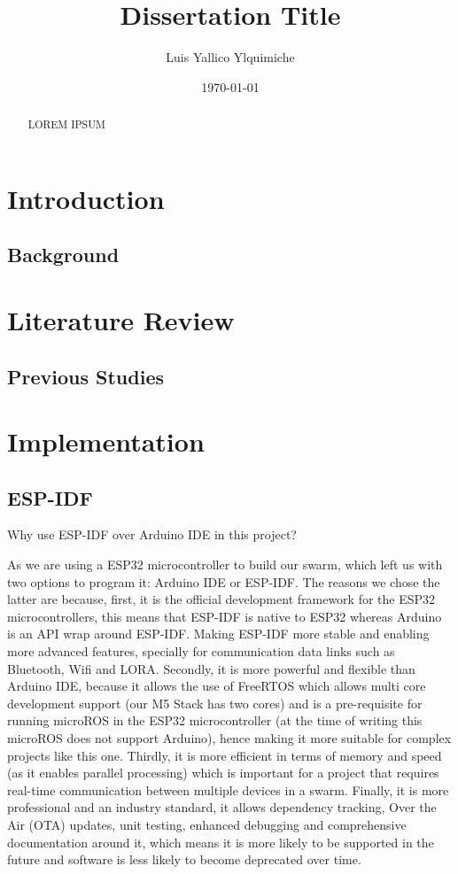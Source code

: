 \documentclass{report}
\title{Dissertation Title}
\author{Luis Yallico Ylquimiche}
\date{\today}
\begin{document}
\maketitle

\begin{abstract}
LOREM IPSUM
\end{abstract}

\tableofcontents

\chapter{Introduction}
\section{Background}
\lipsum[1-2] %

\chapter{Literature Review}
\section{Previous Studies}
\lipsum[3-4] %

\chapter{Implementation}

\section{ESP-IDF}
Why use ESP-IDF over Arduino IDE in this project? \cite{esp-boards_esp-idf_nodate}\cite{expressif_freertos_nodate}

As we are using a ESP32 microcontroller to build our swarm, which left us with two options to program it: Arduino IDE or ESP-IDF. The reasons we chose the latter are because, first, it is the official development framework for the ESP32 microcontrollers, this means that ESP-IDF is native to ESP32 whereas Arduino is an API wrap around ESP-IDF. Making ESP-IDF more stable and enabling more advanced features, specially for communication data links such as Bluetooth, Wifi and LORA. Secondly, it is more powerful and flexible than Arduino IDE, because it allows the use of FreeRTOS which allows multi core development support (our M5 Stack has two cores) and is a pre-requisite for running microROS in the ESP32 microcontroller (at the time of writing this microROS does not support Arduino), hence making it more suitable for complex projects like this one. Thirdly, it is more efficient in terms of memory and speed (as it enables parallel processing) which is important for a project that requires real-time communication between multiple devices in a swarm. Finally, it is more professional and an industry standard, it allows dependency tracking, Over the Air (OTA) updates, unit testing, enhanced debugging and comprehensive documentation around it, which means it is more likely to be supported in the future and software is less likely to become deprecated over time.
\end{document}
